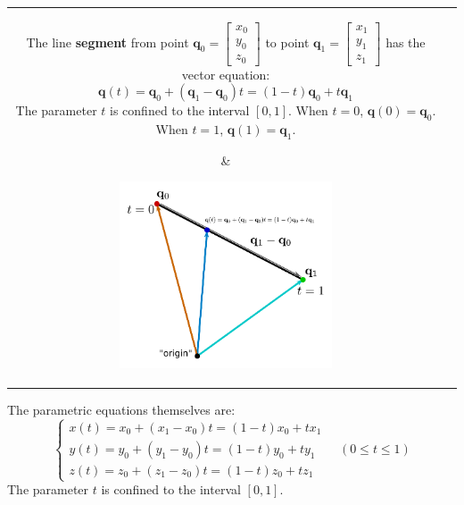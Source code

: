 \documentclass{article}
\begin{document}
\begin{tabular}{cc}
\parbox{0.5\textwidth}{
The line {\bf segment} from point \(\mathbf{q}_0 = \begin{bmatrix} x_0 \\ y_ 0 \\ z_0 \end{bmatrix}\) to point \(\mathbf{q}_1 = \begin{bmatrix} x_1 \\ y_1 \\ z_1 \end{bmatrix}\) has the vector equation:   
\[\mathbf{q}(t) = \mathbf{q}_0 + (\mathbf{q}_1 - \mathbf{q}_0)t  = (1 - t)\mathbf{q}_0 + t \mathbf{q}_1\]
The parameter \(t\) is confined to the interval \([0, 1]\). When \(t = 0\), \(\mathbf{q}(0) = \mathbf{q}_0\). When \(t = 1\), \(\mathbf{q}(1) = \mathbf{q}_1\). 
} & \parbox{0.5\textwidth}{
\includegraphics[width = 0.5\textwidth]{vector_equation_line_segment}
}
\end{tabular}
The parametric equations themselves are:
\[\left\{\begin{array}{c} x(t) = x_0 + (x_1 - x_0)t = (1 - t)x_0 + t x_1 \\ y(t) = y_0 + (y_1 - y_0)t = (1 - t)y_0 + t y_1 \\ z(t) = z_0 + (z_1 - z_0)t = (1 - t)z_0 + t z_1\end{array}\right. \quad (0 \leq t \leq 1)\]
The parameter \(t\) is confined to the interval \([0, 1]\).
\end{document}
